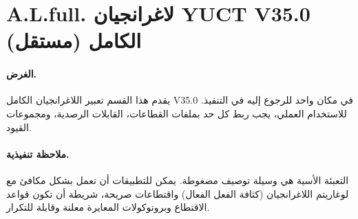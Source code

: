 \documentclass[13pt,a4paper]{article}
\begin{document}
	\section*{A.L.full. لاغرانجيان YUCT V35.0 الكامل (مستقل)}
	\label{sec:full-lagrangian}
	
	\paragraph{الغرض.}
	يقدم هذا القسم تعبير اللاغرانجيان الكامل V35.0 في مكان واحد للرجوع إليه في التنفيذ. للاستخدام العملي، يجب ربط كل حد بملفات القطاعات، القابلات الرصدية، ومجموعات القيود.
	
	\begin{landscape}
		\noindent{}
	\end{landscape}
	
	\paragraph{ملاحظة تنفيذية.}
	التعبئة الأسية هي وسيلة توصيف مضغوطة. يمكن للتطبيقات أن تعمل بشكل مكافئ مع لوغاريتم اللاغرانجيان (كثافة الفعل الفعال) واقتطاعات صريحة، شريطة أن تكون قواعد الاقتطاع وبروتوكولات المعايرة معلنة وقابلة للتكرار.
	
\end{document}
